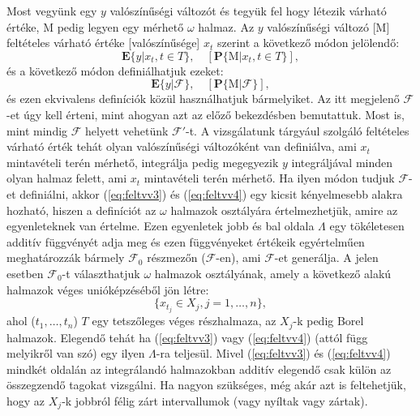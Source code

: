 \documentclass{article}
\begin{document}
Most vegyünk egy $y$ valószínűségi változót és tegyük fel hogy létezik várható értéke, $\mathrm{M}$ pedig legyen egy mérhető $\omega$ halmaz. Az $y$ valószínűségi változó [$\mathrm{M}$] feltételes várható értéke [valószínűsége] $x_t$ szerint a következő módon jelölendő:
\[
  \mathrm{\textbf{E}}\{y|x_t, t \in T\}, \quad [\mathrm{\textbf{P}}\{ \mathrm{M} | x_t, t \in T\}],
\]
és a következő módon definiálhatjuk ezeket:
\[
	\mathrm{\textbf{E}}\{y|\mathscr{F}\}, \quad [\mathrm{\textbf{P}}\{ \mathrm{M} | \mathscr{F}\}],
\]
és ezen ekvivalens definíciók közül használhatjuk bármelyiket. Az itt megjelenő $\mathscr{F}$-et úgy kell érteni, mint ahogyan azt az előző bekezdésben bemutattuk. Most is, mint mindig $\mathscr{F}$ helyett vehetünk $\mathscr{F}'$-t. A vizsgálatunk tárgyául szolgáló feltételes várható érték tehát olyan valószínűségi változóként van definiálva, ami $x_t$ mintavételi terén mérhető, integrálja pedig megegyezik $y$ integráljával minden olyan halmaz felett, ami $x_t$ mintavételi terén mérhető. Ha ilyen módon tudjuk $\mathscr{F}$-et definiálni, akkor (\ref{eq:feltvv3}) és (\ref{eq:feltvv4}) egy kicsit kényelmesebb alakra hozható, hiszen a definíciót az $\omega$ halmazok osztályára értelmezhetjük, amire az egyenleteknek van értelme. Ezen egyenletek jobb és bal oldala $\Lambda$ egy tökéletesen additív függvényét adja meg és ezen függvényeket értékeik egyértelműen meghatározzák bármely $\mathscr{F}_0$ részmezőn ($\mathscr{F}$-en), ami $\mathscr{F}$-et generálja. A jelen esetben $\mathscr{F}_0$-t választhatjuk $\omega$ halmazok osztályának, amely a következő alakú halmazok véges unióképzéséből jön létre:
\[
 \{x_{t_j} \in X_j, j=1,\ldots,n\},
\]
ahol ($t_1,\ldots,t_n$) $T$ egy tetszőleges véges részhalmaza, az $X_j$-k pedig Borel halmazok. Elegendő tehát ha (\ref{eq:feltvv3}) vagy (\ref{eq:feltvv4}) (attól függ melyikről van szó) egy ilyen $\Lambda$-ra teljesül. Mivel (\ref{eq:feltvv3}) és (\ref{eq:feltvv4}) mindkét oldalán az integrálandó halmazokban additív elegendő csak külön az összegzendő tagokat vizsgálni. Ha nagyon szükséges, még akár azt is feltehetjük, hogy az $X_j$-k jobbról félig zárt intervallumok (vagy nyíltak vagy zártak). 
\end{document}
